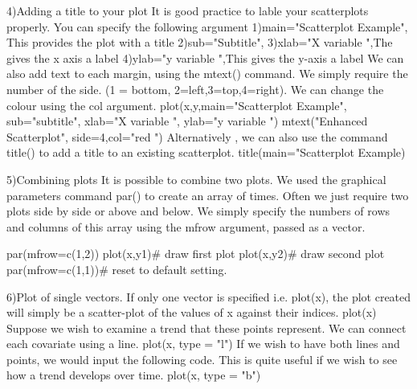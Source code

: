 4)Adding a title to your plot
It is good practice to lable your scatterplots properly. You can specify the following argument
1)main="Scatterplot Example", This provides the plot with a title
2)sub="Subtitle",
3)xlab="X variable ",The gives the x axis a label
4)ylab="y variable ",This gives the y-axis a label
We can also add text to each margin, using the mtext() command.  We simply require the number of the side. (1 = bottom, 2=left,3=top,4=right). We can change the colour using the col argument.
plot(x,y,main="Scatterplot Example",   sub="subtitle",    xlab="X variable ", ylab="y variable ")
mtext("Enhanced Scatterplot", side=4,col="red ")
Alternatively , we can also use the command title() to add a title to an existing scatterplot.
title(main="Scatterplot Example)



5)Combining plots
It is possible to combine two plots. We used the graphical parameters command par() to create an array of times. Often we just require two plots side by side or above and below. We simply specify the numbers of rows  and  columns of this array using the mfrow argument, passed as a vector.

par(mfrow=c(1,2))
plot(x,y1)# draw first plot
plot(x,y2)# draw second plot
par(mfrow=c(1,1))# reset to default setting.
      
6)Plot of single vectors.
If only one vector is specified i.e. plot(x),  the plot created will simply be a scatter-plot of the values of x against their indices.
plot(x)
Suppose we wish to examine a trend that these points represent. We can connect each covariate using a line.
plot(x, type = "l")
If we wish to have both lines and points, we would input the following code. This is quite useful if we wish to see how a trend develops over time.
plot(x, type = "b")

